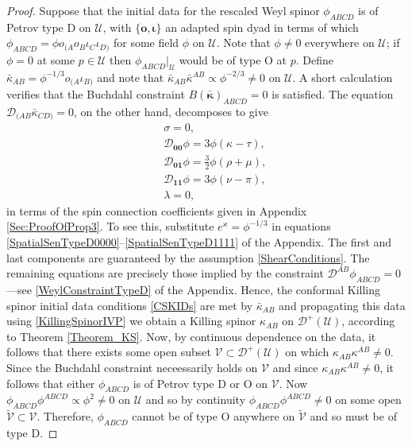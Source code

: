 \documentclass[10pt,a4paper]{article}
\theoremstyle{plain}
\def\bmo{{\bm o}}
\begin{document}
\begin{proof}
  Suppose that the initial data for the rescaled Weyl spinor
  $\phi_{ABCD}$ is of Petrov type D on $\mathcal{U}$, with
$\lbrace \bmo, \bm\iota\rbrace$ an adapted spin dyad in terms of which
$\phi_{ABCD}=\phi o_{(A}o_B\iota_C\iota_{D)}$ for some field
$\phi$ on $\mathcal{U}$. Note that $\phi\neq 0$ everywhere on $\mathcal{U}$; if
$\phi=0$ at some $p\in\mathcal{U}$ then $\phi_{ABCD}|_{\mathcal{U}}$ would be of type O
at $p$. Define $\bar{\kappa}_{AB}=\phi^{-1/3}o_{(A}\iota_{B)}$ and
note that $\bar{\kappa}_{AB}\bar{\kappa}^{AB}\propto\phi^{-2/3}\neq 0$
on $\mathcal{U}$. A short calculation verifies that the Buchdahl
constraint $B(\bar{\bm\kappa})_{ABCD}=0$ is satisfied. The equation
$\mathcal{D}_{(AB}\bar{\kappa}_{CD)}=0$, on the other hand, decomposes
to give
\begin{eqnarray*}
&& \sigma=0,\\
&& \mathcal{D}_{\bm0\bm0}\phi = 3\phi(\kappa - \tau), \\
&& \mathcal{D}_{\bm0\bm1}\phi = \tfrac{3}{2} \phi(\rho + \mu),\\
&& \mathcal{D}_{\bm1\bm1}\phi = 3\phi(\nu - \pi), \\
&& \lambda = 0,
\end{eqnarray*}
in terms of the spin connection coefficients given in Appendix \ref{Sec:ProofOfProp3}. 
To see this, substitute
$e^{\varkappa}=\phi^{-1/3}$ in equations
\eqref{SpatialSenTypeD0000}--\eqref{SpatialSenTypeD1111} of the
Appendix.  The first and last components are guaranteed by the
assumption \eqref{ShearConditions}.  The remaining equations are
precisely those implied by the constraint
$\mathcal{D}^{AB}\phi_{ABCD}=0$ ---see \eqref{WeylConstraintTypeD} of
the Appendix.  Hence, the conformal Killing spinor initial data
conditions \eqref{CSKIDs} are met by $\bar{\kappa}_{AB}$ and
propagating this data using \eqref{KillingSpinorIVP} we obtain a Killing spinor
$\kappa_{AB}$ on $\mathcal{D}^+(\mathcal{U})$, according to Theorem
\ref{Theorem_KS}. Now, by continuous dependence on the data, it
follows that there exists some open subset
$\mathcal{V}\subset\mathcal{D}^+(\mathcal{U})$ on which
$\kappa_{AB}\kappa^{AB}\neq 0$. Since the Buchdahl constraint
neceessarily holds on $\mathcal{V}$ and since
$\kappa_{AB}\kappa^{AB}\neq 0$, it follows that either $\phi_{ABCD}$ is of
Petrov type D or O on $\mathcal{V}$. Now
$\phi_{ABCD}\phi^{ABCD}\propto \phi^2\neq 0$ on $\mathcal{U}$ and so
by continuity $\phi_{ABCD}\phi^{ABCD}\neq 0$ on some open
$\tilde{\mathcal{V}}\subset\mathcal{V}$. Therefore, $\phi_{ABCD}$ cannot
be of type O anywhere on $\tilde{\mathcal{V}}$ and so must be of type
D.
\end{proof}
\end{document}
